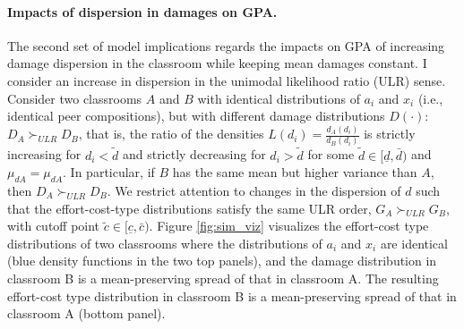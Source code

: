 \paragraph{Impacts of dispersion in damages on GPA.}  The second set of model implications regards the impacts on GPA of increasing damage dispersion in the classroom while keeping mean damages constant. I consider an increase in dispersion in the unimodal likelihood ratio (ULR) sense. Consider two classrooms $A$ and $B$ with identical distributions of $a_i$ and $x_i$ (i.e., identical peer compositions), but with different damage distributions $D(\cdot)$: $D_A \succ_{ULR} D_B$, that is, the ratio of the densities $L(d_i)=\frac{d_A(d_i)}{d_B(d_i)}$ is strictly increasing for $d_i<\tilde{d}$ and strictly decreasing for $d_i>\tilde{d}$ for some $\tilde{d}\in[\underline{d},\bar{d})$ and $\mu_{dA}=\mu_{dA}$. In particular, if $B$ has the same mean but higher variance than $A$, then $D_A \succ_{ULR} D_B$. We restrict attention to changes in the dispersion of $d$ such that the effort-cost-type distributions satisfy the same ULR order, $G_A\succ_{ULR} G_B$, with cutoff point $\tilde{c}\in[\underline{c},\bar{c})$. Figure \ref{fig:sim_viz} visualizes the effort-cost type distributions of two classrooms where the distributions of $a_i$ and $x_i$ are identical (blue density functions in the two top panels), and the damage distribution in classroom B is a mean-preserving spread of that in classroom A. The resulting effort-cost type distribution in classroom B is a mean-preserving spread of that in classroom A (bottom panel).\par


